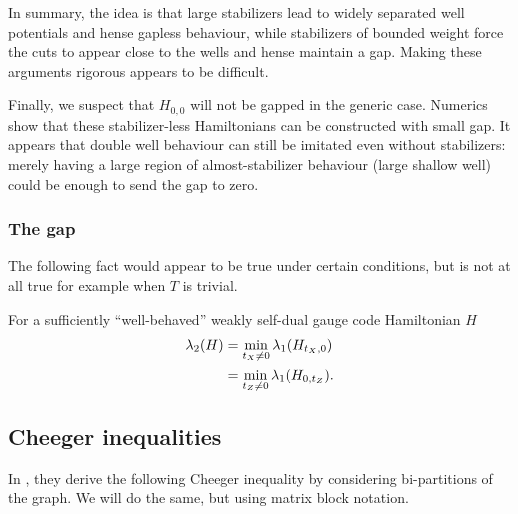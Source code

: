 In summary, the idea is that large stabilizers lead to
widely separated well potentials and hense gapless behaviour,
while stabilizers of bounded weight force the cuts to
appear close to the wells and hense maintain a gap.
Making these arguments rigorous appears to be difficult.

Finally, we suspect that $H_{0,0}$ will not be gapped in
the generic case. Numerics show that these stabilizer-less
Hamiltonians can be constructed with small gap. It appears
that double well behaviour can still be imitated even without
stabilizers: merely having a large region of almost-stabilizer
behaviour (large shallow well) could be enough to send the gap
to zero.



\subsubsection{The gap}

The following fact would appear to be true under certain conditions,
but is not at all true for example when $T$ is trivial.
\begin{framed}

For a sufficiently ``well-behaved''
weakly self-dual
gauge code Hamiltonian $H$
\begin{align*}
\lambda_2(H) 
    &= \min_{t_X\ne 0} \lambda_1(H_{t_X,0})\\
    &= \min_{t_Z\ne 0} \lambda_1(H_{0,t_Z}).
\end{align*}
\end{framed}

\subsection{Cheeger inequalities}

In \cite{Friedland2002}, they derive the following Cheeger inequality
by considering bi-partitions of the graph. We will do the
same, but using matrix block notation.

